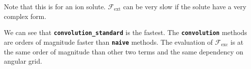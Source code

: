 Note that this is for an ion solute. $\mathcal{F}_{\mathrm{ext}}$
can be very slow if the solute have a very complex form.

We can see that \texttt{\textbf{convolution\_standard}} is the fastest.
The \texttt{\textbf{convolution}} methods are orders of magnitude
faster than \texttt{\textbf{naive}} methods. The evaluation of $\mathcal{F}_{\mathrm{exc}}$
is at the same order of magnitude than other two terms and the same
dependency on angular grid.
